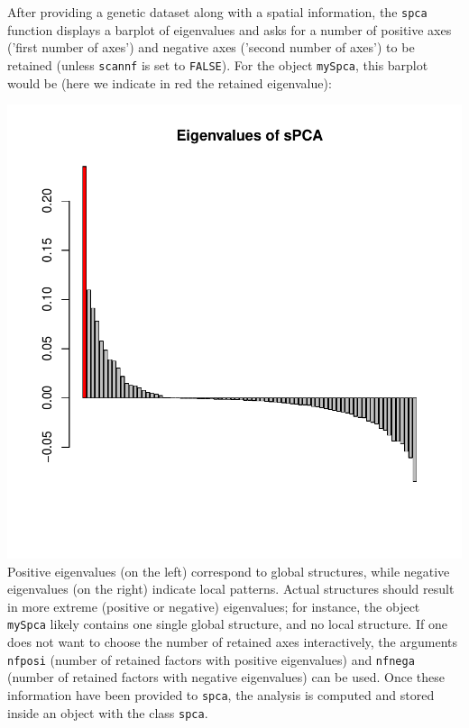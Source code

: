 \documentclass{article}
\begin{document}
After providing a genetic dataset along with a spatial information,
the \texttt{spca} function displays a barplot of eigenvalues and asks
for a number of positive axes ('first number of axes') and negative
axes ('second number of axes') to be retained (unless \texttt{scannf} is set to \texttt{FALSE}).
For the object \texttt{mySpca}, this barplot would be (here we
indicate in red the retained eigenvalue):
\begin{Schunk}
\end{Schunk}
\includegraphics{figs/spca-007}
\noindent Positive eigenvalues (on the left) correspond to global
structures, while negative eigenvalues (on the right) indicate local patterns.
Actual structures should result in more extreme (positive or
negative) eigenvalues; for instance, the object \texttt{mySpca} likely
contains one single global structure, and no local structure.
If one does not want to choose the number of retained axes
interactively, the arguments \texttt{nfposi} (number of retained
factors with positive eigenvalues) and \texttt{nfnega} (number of
retained factors with negative eigenvalues) can be used.
Once these information have been provided to \texttt{spca}, the
analysis is computed and stored inside an object with the class \texttt{spca}.
\end{document}
